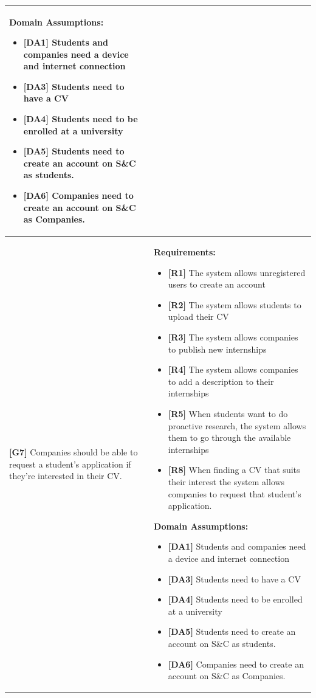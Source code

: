 \begin{longtable}{|p{}|p{}|}
\begin{itemize}
\end{itemize}
\textbf{Domain Assumptions:}
\begin{itemize}
     \item \textbf{[DA1]} Students and companies need a device and internet connection
     \item \textbf{[DA3]} Students need to have a CV
     \item \textbf{[DA4]} Students need to be enrolled at a university
    \item \textbf{[DA5]} Students need to create an account on S\&C as students.
    \item \textbf{[DA6]} Companies need to create an account on S\&C as Companies.
\end{itemize} \\
\hline

\hline
\textbf{[G7]}  Companies should be able to request a student's application if they're interested in their CV.
& 
\textbf{Requirements:}
\begin{itemize}
    \item \textbf{[R1]} The system allows unregistered users to create an account
    \item \textbf{[R2]} The system allows students to upload their CV
    \item \textbf{[R3]} The system allows companies to publish new internships
    \item \textbf{[R4]} The system allows companies to add a description to their internships
    \item \textbf{[R5]} When students want to do proactive research, the system allows them to go through the available internships
    \item \textbf{[R8]} When finding a CV that suits their interest the system allows companies to request that student's application.
\end{itemize}
\textbf{Domain Assumptions:}
\begin{itemize}
     \item \textbf{[DA1]} Students and companies need a device and internet connection
     \item \textbf{[DA3]} Students need to have a CV
     \item \textbf{[DA4]} Students need to be enrolled at a university
    \item \textbf{[DA5]} Students need to create an account on S\&C as students.
    \item \textbf{[DA6]} Companies need to create an account on S\&C as Companies.
\end{itemize} \\
\hline



\end{longtable}
